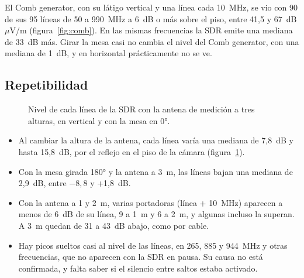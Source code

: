 \documentclass[11pt,a4paper]{article}
\begin{document}
El Comb generator, con su látigo vertical y una línea cada 10~MHz, se vio con 90 de sus 95 líneas de 50 a 990~MHz a 6~dB o más sobre el piso, entre 41,5 y 67~dB$\mu$V/m (figura~\ref{fig:comb}). En las mismas frecuencias la SDR emite una mediana de 33~dB más. Girar la mesa casi no cambia el nivel del Comb generator, con una mediana de 1~dB, y en horizontal prácticamente no se ve.

\subsection{Repetibilidad}

\begin{figure}[H]
  \centering
  \caption{Nivel de cada línea de la SDR con la antena de medición a tres alturas, en vertical y con la mesa en 0°.}
  \label{fig:alturas}
\end{figure}

\begin{itemize}
  \item Al cambiar la altura de la antena, cada línea varía una mediana de 7,8~dB y hasta 15,8~dB, por el reflejo en el piso de la cámara (figura~\ref{fig:alturas}).
  \item Con la mesa girada 180° y la antena a 3~m, las líneas bajan una mediana de 2,9~dB, entre $-8{,}8$ y +1,8~dB.
  \item Con la antena a 1 y 2~m, varias portadoras (línea + 10~MHz) aparecen a menos de 6~dB de su línea, 9 a 1~m y 6 a 2~m, y algunas incluso la superan. A 3~m quedan de 31 a 43~dB abajo, como por cable.
  \item Hay picos sueltos casi al nivel de las líneas, en 265, 885 y 944~MHz y otras frecuencias, que no aparecen con la SDR en pausa. Su causa no está confirmada, y falta saber si el silencio entre saltos estaba activado.
\end{itemize}
\end{document}
